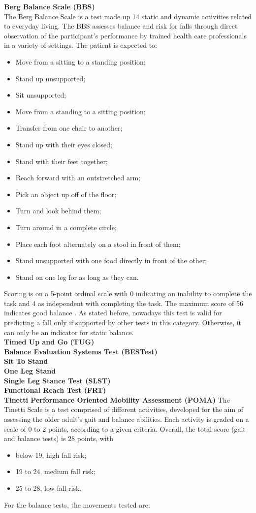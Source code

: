 \textbf{Berg Balance Scale (BBS)}
\\The Berg Balance Scale is a test made up 14 static and dynamic activities related to everyday living. The BBS assesses balance and risk for falls through direct observation of the participant's performance by trained health care professionals in a variety of settings. The patient is expected to:
\begin{itemize}
    \item Move from a sitting to a standing position;
    \item Stand up unsupported;
    \item Sit unsupported;
    \item Move from a standing to a sitting position;
    \item Transfer from one chair to another;
    \item Stand up with their eyes closed;
    \item Stand with their feet together;
    \item Reach forward with an outstretched arm;
    \item Pick an object up off of the floor;
    \item Turn and look behind them;
    \item Turn around in a complete circle;
    \item Place each foot alternately on a stool in front of them;
    \item Stand unsupported with one food directly in front of the other;
    \item Stand on one leg for as long as they can.
\end{itemize}
Scoring is on a 5-point ordinal scale with 0 indicating an inability to complete the task and 4 as independent with completing the task. The maximum score of 56 indicates good balance \cite{BergBalanceScale}. As stated before, nowadays this test is valid for predicting a fall only if supported by other tests in this category. Otherwise, it can only be an indicator for static balance.
\\\textbf{Timed Up and Go (TUG)}
\\\textbf{Balance Evaluation Systems Test (BESTest)}
\\\textbf{Sit To Stand}
\\\textbf{One Leg Stand}
\\\textbf{Single Leg Stance Test (SLST)}
\\\textbf{Functional Reach Test (FRT)}
\\\textbf{Tinetti Performance Oriented Mobility Assessment
(POMA)}
The Tinetti Scale is a test comprised of different activities, developed for the aim of assessing the older adult’s gait and balance abilities. Each activity is graded on a scale of 0 to 2 points, according to a given criteria. Overall, the total score (gait and balance tests) is 28 points, with 
\begin{itemize}
    \item below 19, high fall risk;
    \item 19 to 24, medium fall risk;
    \item 25 to 28, low fall risk.
\end{itemize}
For the balance tests, the movements tested are:

